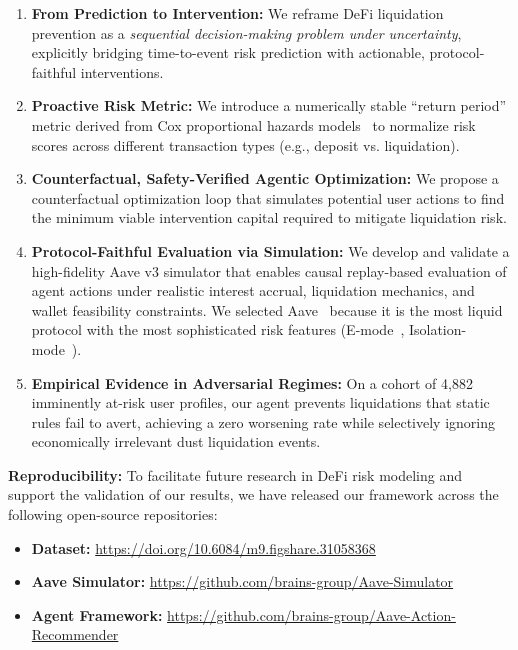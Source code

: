 \documentclass[manuscript,screen,review]{acmart}
\begin{document}
\begin{enumerate}
    \item \textbf{From Prediction to Intervention:} We reframe DeFi liquidation prevention as a \emph{sequential decision-making problem under uncertainty}, explicitly bridging time-to-event risk prediction with actionable, protocol-faithful interventions.

    \item \textbf{Proactive Risk Metric:} We introduce a numerically stable ``return period'' metric derived from Cox proportional hazards models~\cite{cox1972regression} to normalize risk scores across different transaction types (e.g., deposit vs. liquidation).
    
    \item \textbf{Counterfactual, Safety-Verified Agentic Optimization:} We propose a counterfactual optimization loop that simulates potential user actions to find the minimum viable intervention capital required to mitigate liquidation risk.

    \item \textbf{Protocol-Faithful Evaluation via Simulation:} We develop and validate a high-fidelity Aave v3 simulator that enables causal replay-based evaluation of agent actions under realistic interest accrual, liquidation mechanics, and wallet feasibility constraints. We selected Aave~\cite{aave_v3_technical_paper} because it is the most liquid protocol with the most sophisticated risk features (E-mode~\cite{aave_emode}, Isolation-mode~\cite{aave_isolation_mode}).

    \item \textbf{Empirical Evidence in Adversarial Regimes:} On a cohort of 4,882 imminently at-risk user profiles, our agent prevents liquidations that static rules fail to avert, achieving a zero worsening rate while selectively ignoring economically irrelevant dust liquidation events.

\end{enumerate}

\noindent \textbf{Reproducibility:} To facilitate future research in DeFi risk modeling and support the validation of our results, we have released our framework across the following open-source repositories:
\begin{itemize}[leftmargin=*, noitemsep, topsep=0pt]
    \item \textbf{Dataset:} \url{https://doi.org/10.6084/m9.figshare.31058368}
    \item \textbf{Aave Simulator:} \url{https://github.com/brains-group/Aave-Simulator}
    \item \textbf{Agent Framework:} \url{https://github.com/brains-group/Aave-Action-Recommender}
\end{itemize}
\end{document}
